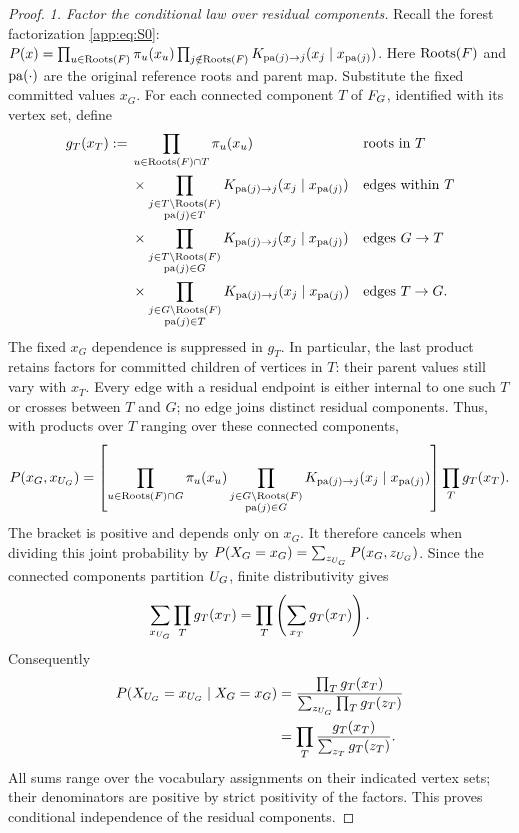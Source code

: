 \begin{proof}

\emph{1. Factor the conditional law over residual components.}
Recall the forest factorization \eqref{app:eq:S0}:
$P(x)=\prod_{u\in\operatorname{Roots}(F)}\pi_{u}(x_u)
 \prod_{j\notin\operatorname{Roots}(F)}K_{\operatorname{pa}(j)\to j}
 (x_j\mid x_{\operatorname{pa}(j)})$.
Here $\operatorname{Roots}(F)$ and $\operatorname{pa}(\cdot)$ are the original reference roots
and parent map.  Substitute the fixed committed values $x_G$.
For each connected component $T$ of $F_{G}$, identified with
its vertex set, define
\[
\begin{aligned}
 g_T(x_T):={}&
 \prod_{u\in\operatorname{Roots}(F)\cap T}\pi_{u}(x_u)
 &&\text{roots in }T\\
 &{}\times
 \prod_{\substack{j\in T\setminus\operatorname{Roots}(F)\\\operatorname{pa}(j)\in T}}
 K_{\operatorname{pa}(j)\to j}(x_j\mid x_{\operatorname{pa}(j)})
 &&\text{edges within }T\\
 &{}\times
 \prod_{\substack{j\in T\setminus\operatorname{Roots}(F)\\\operatorname{pa}(j)\in G}}
 K_{\operatorname{pa}(j)\to j}(x_j\mid x_{\operatorname{pa}(j)})
 &&\text{edges }G\to T\\
 &{}\times
 \prod_{\substack{j\in G\setminus\operatorname{Roots}(F)\\\operatorname{pa}(j)\in T}}
 K_{\operatorname{pa}(j)\to j}(x_j\mid x_{\operatorname{pa}(j)})
 &&\text{edges }T\to G.
\end{aligned}
\]
The fixed $x_G$ dependence is suppressed in $g_T$.
In particular, the last product retains factors for committed children of
vertices in $T$: their parent values still vary with $x_T$.
Every edge with a residual endpoint is either internal to one such $T$ or
crosses between $T$ and $G$; no edge joins distinct residual components.
Thus, with products over $T$ ranging over these connected components,
\[
 P(x_G,x_{U_{G}})
 =
 \left[
 \prod_{u\in\operatorname{Roots}(F)\cap G}\pi_{u}(x_u)
 \prod_{\substack{j\in G\setminus\operatorname{Roots}(F)\\\operatorname{pa}(j)\in G}}
 K_{\operatorname{pa}(j)\to j}(x_j\mid x_{\operatorname{pa}(j)})
 \right]\prod_T g_T(x_T).
\]
The bracket is positive and depends only on $x_G$.
It therefore cancels when dividing this joint probability by
$P(X_G=x_G)
 =\sum_{z_{U_{G}}}P(x_G,z_{U_{G}})$.
Since the connected components partition $U_{G}$,
finite distributivity gives
\[
 \sum_{x_{U_{G}}}\prod_T g_T(x_T)
 =\prod_T\left(\sum_{x_T}g_T(x_T)\right).
\]
Consequently
\[
\begin{aligned}
 P(X_{U_{G}}=x_{U_{G}}\mid X_G=x_G)
 &=\frac{\prod_T g_T(x_T)}
         {\sum_{z_{U_{G}}}\prod_T g_T(z_T)}\\
 &=\prod_T\frac{g_T(x_T)}{\sum_{z_T}g_T(z_T)}.
\end{aligned}
\]
All sums range over the vocabulary assignments on their indicated vertex
sets; their denominators are positive by strict positivity of the factors.
This proves conditional independence of the residual components.



\end{proof}
